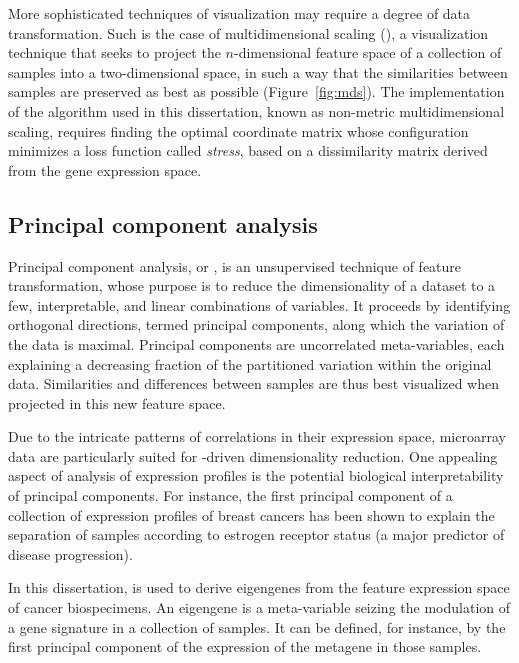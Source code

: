 More sophisticated techniques of visualization may require a degree of data
transformation.  Such is the case of multidimensional scaling (),
a visualization technique that seeks to project the $n$-dimensional feature
space of a collection of samples into a two-dimensional space, in such a way
that the similarities between samples are preserved as best as possible
(Figure~\ref{fig:mds}).  The implementation of the  algorithm
used in this dissertation, known as non-metric multidimensional scaling,
requires finding the optimal coordinate matrix whose configuration minimizes a
loss function called \emph{stress}, based on a dissimilarity matrix derived from
the gene expression space.\cite{borg_modern_2005}

\subsection{Principal component analysis}
\label{sec:methods-pc}
Principal component analysis, or , is an unsupervised technique
of feature transformation, whose purpose is to reduce the dimensionality of a
dataset to a few, interpretable, and linear combinations of
variables.\cite{pearson_liii._1901} It proceeds by identifying orthogonal
directions, termed principal components, along which the variation of the data
is maximal.  Principal components are uncorrelated meta-variables, each
explaining a decreasing fraction of the partitioned variation within the
original data.  Similarities and differences between samples are thus best
visualized when projected in this new feature space.

Due to the intricate patterns of correlations in their expression space, microarray
data are particularly suited for -driven dimensionality
reduction.\cite{ringner_what_2008} One appealing aspect of 
analysis of expression profiles is the potential biological interpretability of
principal components.  For instance, the first principal component of a
collection of expression profiles of breast cancers has been shown to explain
the separation of samples according to estrogen receptor status (a major
predictor of disease progression).\cite{saal_poor_2007}

In this dissertation,  is used to derive eigengenes from the
feature expression space of cancer biospecimens.  An eigengene is a
meta-variable seizing the modulation of a gene signature in a collection of
samples.  It can be defined, for instance, by the first principal component of
the expression of the metagene in those samples.

